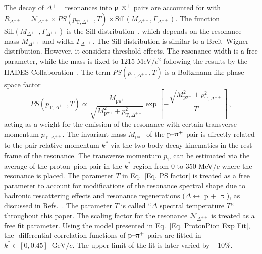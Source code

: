 \documentclass[ALICE,manyauthors]{cernphprep}
\begin{document}
 The decay of $\Delta^{++}$ resonances into $\text{p--}\uppi^+$ pairs are accounted for with $R_{\Delta^{++}} = \mathcal{N}_{\Delta^{++}} \times PS(p_{\text{T},\Delta^{++}}, T) \times \text{Sill}(M_{\Delta^{++}}, \Gamma_{\Delta^{++}})$. The function $\text{Sill}(M_{\Delta^{++}}, \Gamma_{\Delta^{++}})$ is the Sill distribution~\cite{GiacosaSill}, which depends on the resonance mass $M_{\Delta^{++}}$ and width $\Gamma_{\Delta^{++}}$. The Sill distribution is similar to a Breit--Wigner distribution. However, it considers threshold effects. The resonance width is a free parameter, while the mass is fixed to 1215 MeV$/c^2$ following the results by the HADES Collaboration~\cite{Adamczewski-Musch:2020edy}. The term $PS(p_{\text{T},\Delta^{++}},T)$ is a Boltzmann-like phase space factor
\begin{equation}
    PS(p_{\text{T},\Delta^{++}}, T) \propto \frac{M_{\text{p}\uppi^+}}{\sqrt{M_{\text{p}\uppi^+}^2+p_{\text{T},\Delta^{++}}^2}}\exp\left[ - \frac{\sqrt{M_{\text{p}\uppi^+}^2+p_{\text{T},\Delta^{++}}^2}}{T} \right]\,, \label{Eq. PS factor}
\end{equation}
acting as a weight for the emission of the resonance with certain transverse momentum $p_{\text{T},\Delta^{++}}$. The invariant mass $M_{\text{p}\uppi^+}$ of the $\text{p--}\uppi^+$ pair is directly related to the pair relative momentum $k^*$ via the two-body decay kinematics in the rest frame of the resonance. The transverse momentum $p_{\text{T}}$ can be estimated via the average \mtText{} of the proton--pion pair in the $k^*$ region from 0 to 350 MeV$/c$ where the resonance is placed. The parameter $T$ in Eq.~\eqref{Eq. PS factor} is treated as a free parameter to account for modifications of the resonance spectral shape due to hadronic rescattering effects and resonance regenerations ($\Delta \leftrightarrow$ p + $\uppi$), as discussed in Refs.~\cite{ Reichert:2019lny, Reichert:2022uha}.
The parameter $T$ is called ``$\Delta$ spectral temperature $T$`` throughout this paper. The scaling factor for the resonance $\mathcal{N}_{\Delta^{++}}$ is treated as a free fit parameter. Using the model presented in Eq.~\eqref{Eq. ProtonPion Exp Fit}, the \mtText-differential correlation functions of $\text{p--}\uppi^+$ pairs are fitted in $k^*\in[0,0.45]~\text{ GeV}/c$. The upper limit of the fit is later varied by $\pm$10\%.
\end{document}
